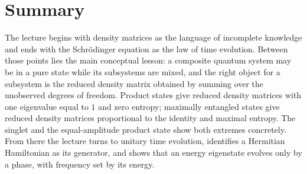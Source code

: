 \section{Summary}

The lecture begins with density matrices as the language of incomplete knowledge and ends with the Schr\"odinger equation as the law of time evolution. Between those points lies the main conceptual lesson: a composite quantum system may be in a pure state while its subsystems are mixed, and the right object for a subsystem is the reduced density matrix obtained by summing over the unobserved degrees of freedom. Product states give reduced density matrices with one eigenvalue equal to \(1\) and zero entropy; maximally entangled states give reduced density matrices proportional to the identity and maximal entropy. The singlet and the equal-amplitude product state show both extremes concretely. From there the lecture turns to unitary time evolution, identifies a Hermitian Hamiltonian as its generator, and shows that an energy eigenstate evolves only by a phase, with frequency set by its energy.